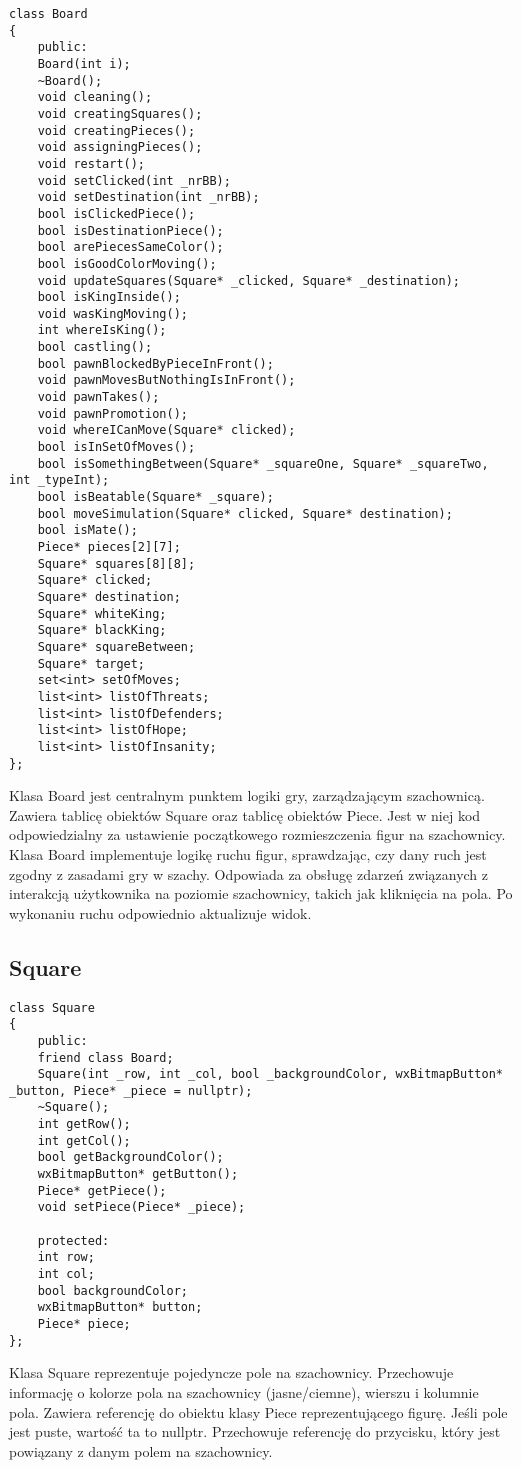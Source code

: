 \documentclass[]{report}
\begin{document}
\begin{lstlisting}
class Board
{
	public:
	Board(int i);
	~Board();
	void cleaning();
	void creatingSquares();
	void creatingPieces();
	void assigningPieces();
	void restart();
	void setClicked(int _nrBB);
	void setDestination(int _nrBB);
	bool isClickedPiece();
	bool isDestinationPiece();
	bool arePiecesSameColor();
	bool isGoodColorMoving();
	void updateSquares(Square* _clicked, Square* _destination);
	bool isKingInside();
	void wasKingMoving();
	int whereIsKing();
	bool castling();
	bool pawnBlockedByPieceInFront();
	void pawnMovesButNothingIsInFront();
	void pawnTakes();
	void pawnPromotion();
	void whereICanMove(Square* clicked);
	bool isInSetOfMoves();
	bool isSomethingBetween(Square* _squareOne, Square* _squareTwo, int _typeInt);
	bool isBeatable(Square* _square);
	bool moveSimulation(Square* clicked, Square* destination);
	bool isMate();
	Piece* pieces[2][7];
	Square* squares[8][8];
	Square* clicked;
	Square* destination;
	Square* whiteKing;
	Square* blackKing;
	Square* squareBetween;
	Square* target;
	set<int> setOfMoves;
	list<int> listOfThreats;
	list<int> listOfDefenders;
	list<int> listOfHope;
	list<int> listOfInsanity;
};

\end{lstlisting}
\begin{flushleft}
Klasa Board jest centralnym punktem logiki gry, zarządzającym szachownicą. Zawiera tablicę obiektów Square oraz tablicę obiektów Piece. Jest w niej kod odpowiedzialny za ustawienie początkowego rozmieszczenia figur na szachownicy. Klasa Board implementuje logikę ruchu figur, sprawdzając, czy dany ruch jest zgodny z zasadami gry w szachy. Odpowiada za obsługę zdarzeń związanych z interakcją użytkownika na poziomie szachownicy, takich jak kliknięcia na pola. Po wykonaniu ruchu odpowiednio aktualizuje widok.
\end{flushleft}
\subsection*{Square}

\begin{lstlisting}
class Square
{
	public:
	friend class Board;
	Square(int _row, int _col, bool _backgroundColor, wxBitmapButton* _button, Piece* _piece = nullptr);
	~Square();
	int getRow();
	int getCol();
	bool getBackgroundColor();
	wxBitmapButton* getButton();
	Piece* getPiece();
	void setPiece(Piece* _piece);
	
	protected:
	int row;
	int col;
	bool backgroundColor;
	wxBitmapButton* button;
	Piece* piece;
};
\end{lstlisting}
\begin{flushleft}
Klasa Square reprezentuje pojedyncze pole na szachownicy. Przechowuje informację o kolorze pola na szachownicy (jasne/ciemne), wierszu i kolumnie pola. Zawiera referencję do obiektu klasy Piece reprezentującego figurę. Jeśli pole jest puste, wartość ta to nullptr. Przechowuje referencję do przycisku, który jest powiązany z danym polem na szachownicy.
\end{flushleft}
\end{document}
